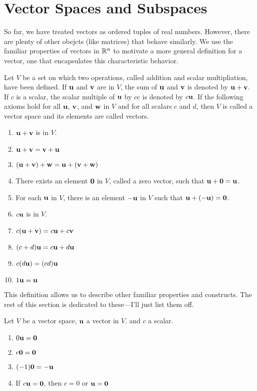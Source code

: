 \documentclass[../m73main.tex]{chapters}
\begin{document}
\section{Vector Spaces and Subspaces}
So far, we have treated vectors as ordered tuples of real numbers.
However, there are plenty of other obejcts (like matrices) that behave similarly.
We use the familiar properties of vectors in $\mathbb{R}^n$ to motivate a more general definition for a vector, one that encapsulates this characteristic behavior.

\begin{definition}
	Let $V$ be a set on which two operations, called addition and scalar multipliation, have been defined.
	If $\mathbf{u}$ and $\mathbf{v}$ are in $V$, the sum of $\mathbf{u}$ and $\mathbf{v}$ is denoted by $\mathbf{u} + \mathbf{v}$.
	If $c$ is a scalar, the scalar multiple of $\mathbf{u}$ by $c$c is denoted by $c \mathbf{u}$.
	If the following axioms hold for all $\mathbf{u}$, $\mathbf{v}$, and $\mathbf{w}$ in $V$ and for all scalars $c$ and $d$, then $V$ is called a vector space and its elements are called vectors.
	\begin{enumerate}
		\item $\mathbf{u} + \mathbf{v}$ is in $V$.
		\item $\mathbf{u} + \mathbf{v} = \mathbf{v} + \mathbf{u}$
		\item $(\mathbf{u} + \mathbf{v}) + \mathbf{w} = \mathbf{u} + (\mathbf{v} + \mathbf{w})$
		\item There exists an element $\mathbf{0}$ in $V$, called a zero vector, such that $\mathbf{u} + \mathbf{0} = \mathbf{u}$.
		\item For each $\mathbf{u}$ in $V$, there is an element $-\mathbf{u}$ in $V$ such that $\mathbf{u} + (-\mathbf{u}) = \mathbf{0}$.
		\item $c \mathbf{u}$ is in $V$.
		\item $c(\mathbf{u} + \mathbf{v}) = c \mathbf{u} + c \mathbf{v}$
		\item $(c + d) \mathbf{u} = c \mathbf{u} + d \mathbf{u}$
		\item $c(d \mathbf{u}) = (cd) \mathbf{u}$
		\item $1 \mathbf{u} = \mathbf{u}$
	\end{enumerate}
\end{definition}

This definition allows us to describe other familiar properties and constructs.
The rest of this section is dedicated to these---I'll just list them off.

\begin{theorem}
	Let $V$ be a vector space, $\mathbf{u}$ a vector in $V$. and $c$ a scalar.
	\begin{enumerate}[label=(\alph*)]
		\item $0 \mathbf{u} = \mathbf{0}$
		\item $c \mathbf{0} = \mathbf{0}$
		\item $(-1) \mathbf{0} = -\mathbf{u}$
		\item If $c \mathbf{u} = \mathbf{0}$, then $c = 0$ or $\mathbf{u} = \mathbf{0}$
	\end{enumerate}
\end{theorem}
\end{document}
